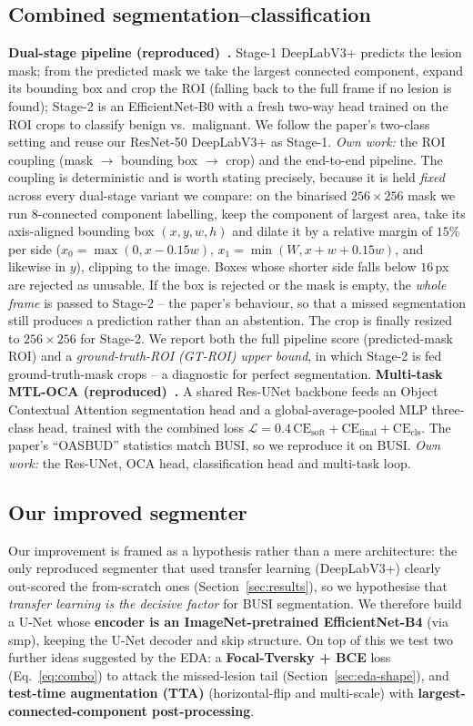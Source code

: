 \documentclass[11pt]{article}
\begin{document}
\subsection{Combined segmentation--classification}
\label{sec:combined}
\textbf{Dual-stage pipeline (reproduced)~\cite{bruno2025dualstage}.} Stage-1
DeepLabV3+ predicts the lesion mask; from the predicted mask we take the largest
connected component, expand its bounding box and crop the ROI (falling back to the
full frame if no lesion is found); Stage-2 is an EfficientNet-B0 with a fresh
two-way head trained on the ROI crops to classify benign vs.\ malignant. We follow
the paper's two-class setting and reuse our ResNet-50 DeepLabV3+ as Stage-1.
\emph{Own work:} the ROI coupling (mask $\to$ bounding box $\to$ crop) and the
end-to-end pipeline. The coupling is deterministic and is worth stating precisely,
because it is held \emph{fixed} across every dual-stage variant we compare: on the
binarised $256\times256$ mask we run 8-connected component labelling, keep the
component of largest area, take its axis-aligned bounding box $(x,y,w,h)$ and
dilate it by a relative margin of $15\%$ per side
($x_0=\max(0,x-0.15w)$, $x_1=\min(W,x+w+0.15w)$, and likewise in $y$), clipping to
the image. Boxes whose shorter side falls below $16$\,px are rejected as
unusable. If the box is rejected or the mask is empty, the \emph{whole frame} is
passed to Stage-2 -- the paper's behaviour, so that a missed segmentation still
produces a prediction rather than an abstention. The crop is finally resized to
$256\times256$ for Stage-2. We report both the full pipeline score (predicted-mask ROI)
and a \emph{ground-truth-ROI (GT-ROI) upper bound}, in which Stage-2 is fed
ground-truth-mask crops -- a diagnostic for perfect segmentation.
\textbf{Multi-task MTL-OCA (reproduced)~\cite{lu2025multitask}.} A shared Res-UNet
backbone feeds an Object Contextual Attention segmentation head and a
global-average-pooled MLP three-class head, trained with the combined loss
$\mathcal{L}=0.4\,\mathrm{CE}_{\text{soft}}+\mathrm{CE}_{\text{final}}+\mathrm{CE}_{\text{cls}}$.
The paper's ``OASBUD'' statistics match BUSI, so we reproduce it on BUSI.
\emph{Own work:} the Res-UNet, OCA head, classification head and multi-task loop.

\subsection{Our improved segmenter}
\label{sec:improved-seg}
Our improvement is framed as a hypothesis rather than a mere architecture: the
only reproduced segmenter that used transfer learning (DeepLabV3+) clearly
out-scored the from-scratch ones (Section~\ref{sec:results}), so we hypothesise
that \emph{transfer learning is the decisive factor} for BUSI segmentation. We
therefore build a U-Net whose \textbf{encoder is an ImageNet-pretrained
EfficientNet-B4} (via smp), keeping the U-Net decoder and skip structure. On top
of this we test two further ideas suggested by the EDA: a \textbf{Focal-Tversky +
BCE} loss (Eq.~\ref{eq:combo}) to attack the missed-lesion tail
(Section~\ref{sec:eda-shape}), and \textbf{test-time augmentation (TTA)}
(horizontal-flip and multi-scale) with \textbf{largest-connected-component
post-processing}.
\end{document}
